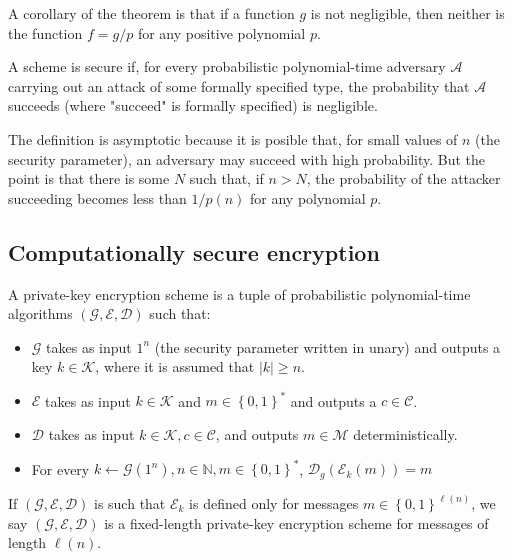 \documentclass[a4paper, 12pt]{article}
\begin{document}
A corollary of the theorem is that if a function $g$ is not 
negligible, then neither is the function $f = g / p$  for any 
positive polynomial $p$.

\begin{definition}
    A scheme is secure if, for every probabilistic polynomial-time 
    adversary $\mathcal{A}$ carrying out an attack of some 
    formally specified type, the probability that $\mathcal{A}$
    succeeds (where "succeed" is formally specified) is 
    negligible.
\end{definition}

The definition is asymptotic because it is posible that, for small 
values of $n$ (the security parameter), an adversary may succeed with 
high probability. But the point is that there is some $N$ such that,
if $n > N$, the probability of the attacker succeeding becomes less 
than $1 / p(n)$ for any polynomial $p$.

\subsection{Computationally secure encryption}

\begin{definition}
    A private-key encryption scheme is a tuple of probabilistic 
    polynomial-time algorithms $(\mathcal{G}, \mathcal{E}, \mathcal{D})$
    such that: 

    \begin{itemize}
        \item $\mathcal{G}$ takes as input $1^n$ (the security 
            parameter written in unary) and outputs a key $k \in \mathcal{K}$,
            where it is assumed that $|k| \geq n$.
        \item $\mathcal{E}$ takes as input $k \in \mathcal{K}$ and 
            $m \in \left\{ 0,1 \right\}^{*} $ and outputs a 
            $c \in \mathcal{C}$.
        \item $\mathcal{D}$ takes as input $k \in \mathcal{K}, c \in \mathcal{C}$, and outputs $m \in \mathcal{M}$ deterministically.
        \item For every $k \leftarrow \mathcal{G}(1^n), n \in \mathbb{N}, m \in \left\{ 0,1 \right\}^{*} $, $\mathcal{D}_g\left( \mathcal{E}_k(m) \right) = m $
    \end{itemize}
\end{definition}

If $(\mathcal{G}, \mathcal{E}, \mathcal{D})$ is such that $\mathcal{E}_k$ is defined only for messages $m \in \left\{ 0, 1 \right\}^{\ell(n)} $, we say $(\mathcal{G}, \mathcal{E}, \mathcal{D})$ is a fixed-length 
private-key encryption scheme for messages of length $\ell(n)$.
\end{document}

